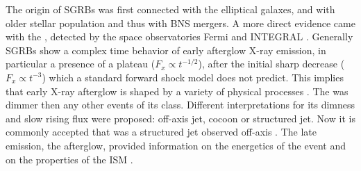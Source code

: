 %
%
The origin of \acp{SGRB} was first connected with the elliptical galaxes, and with 
older stellar population 
\citep[\eg][]{Gehrels:2005qk,Fox:2005kv,Barthelmy:2005bx,Berger:2005dr,Panaitescu:2005er,Bloom:2005qx,Guetta:2005bb,Nakar:2007yr} 
and thus with \ac{BNS} mergers. A more direct evidence came with the \GRB{}
\citep{Savchenko:2017ffs,Alexander:2017aly,Troja:2017nqp,Monitor:2017mdv,Nynka:2018vup,Hajela:2019mjy}, 
detected by the space observatories Fermi \citep{TheFermi-LAT:2015kwa} and INTEGRAL \citep{Winkler:2011}.
%
Generally \acp{SGRB} show a complex time behavior of early afterglow X-ray emission, 
in particular a presence of a plateau ($F_{x}\propto t^{-1/2}$), after the initial sharp 
decrease ($F_{x}\propto t^{-3}$) which a standard forward shock model does not predict. 
This implies that early X-ray afterglow is shaped by a variety of physical processes 
\citep{Zhang:2005fa}.
%
The \GRB{} was dimmer then any other events of its class. 
Different interpretations for its dimness and slow rising flux were proposed: off-axis jet, 
cocoon or structured jet. Now it is commonly accepted that \GRB{} was a structured jet 
observed off-axis 
\citep[\eg][]{Fong:2017ekk,Troja:2017nqp,Margutti:2018xqd,Lamb:2017ych,Lamb:2018ohw,Ryan:2019fhz,Alexander:2018dcl,Mooley:2018dlz,Ghirlanda:2018uyx}.
The \GRB{} late emission, the afterglow, provided information on 
the energetics of the event and on the properties of the \ac{ISM} 
\citep[\eg][]{Hajela:2019mjy}. 

